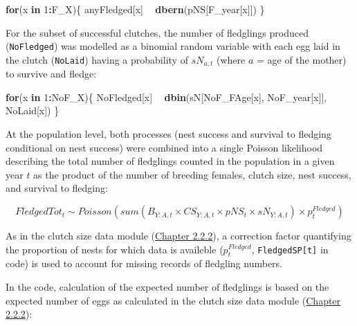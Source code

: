 \documentclass[
]{book}
\newenvironment{Shaded}{\begin{snugshade}}{\end{snugshade}}
\newcommand{\ControlFlowTok}[1]{\textcolor[rgb]{0.13,0.29,0.53}{\textbf{#1}}}
\newcommand{\DecValTok}[1]{\textcolor[rgb]{0.00,0.00,0.81}{#1}}
\newcommand{\KeywordTok}[1]{\textcolor[rgb]{0.13,0.29,0.53}{\textbf{#1}}}
\newcommand{\NormalTok}[1]{#1}
\newcommand{\OperatorTok}[1]{\textcolor[rgb]{0.81,0.36,0.00}{\textbf{#1}}}
\newcommand{\StringTok}[1]{\textcolor[rgb]{0.31,0.60,0.02}{#1}}
\begin{document}
\begin{Shaded}
\begin{Highlighting}[]
\ControlFlowTok{for}\NormalTok{(x }\ControlFlowTok{in} \DecValTok{1}\OperatorTok{:}\NormalTok{F_X)\{}
\NormalTok{  anyFledged[x] }\OperatorTok{~}\StringTok{ }\KeywordTok{dbern}\NormalTok{(pNS[F_year[x]])}
\NormalTok{\}}
\end{Highlighting}
\end{Shaded}

For the subset of successful clutches, the number of fledglings produced
(\texttt{NoFledged}) was modelled as a binomial random variable with each egg laid in
the clutch (\texttt{NoLaid}) having a probability of \(sN_{a,t}\) (where \(a\) = age of the
mother) to survive and fledge:

\begin{Shaded}
\begin{Highlighting}[]
\ControlFlowTok{for}\NormalTok{(x }\ControlFlowTok{in} \DecValTok{1}\OperatorTok{:}\NormalTok{NoF_X)\{}
\NormalTok{    NoFledged[x] }\OperatorTok{~}\StringTok{ }\KeywordTok{dbin}\NormalTok{(sN[NoF_FAge[x], NoF_year[x]], NoLaid[x])}
\NormalTok{\}}
\end{Highlighting}
\end{Shaded}

At the population level, both processes (nest success and survival to fledging
conditional on nest success) were combined into a single Poisson
likelihood describing the total number of fledglings counted in the population
in a given year \(t\) as the product of the number of breeding females, clutch
size, nest success, and survival to fledging:

\begin{equation}
FledgedTot_t  \sim Poisson(sum(B_{Y:A,t}\times CS_{Y:A,t}\times pNS_t\times sN_{Y:A,t}) \times p_t^{Fledged})
\end{equation}

As in the clutch size data module (\protect\hyperlink{ux5cux23ux5cux23ux5cux2520Clutchux5cux2520sizeux5cux2520dataux5cux2520likelihoods}{Chapter 2.2.2}),
a correction factor quantifying the proportion of nests for which data is
availeble (\(p_t^{Fledged}\), \texttt{FledgedSP{[}t{]}} in code) is used to account for
missing records of fledgling numbers.

In the code, calculation of the expected number of fledglings is based on the expected number of eggs as calculated in the clutch size data module
(\protect\hyperlink{ux5cux23ux5cux23ux5cux2520Clutchux5cux2520sizeux5cux2520dataux5cux2520likelihoods}{Chapter 2.2.2}):
\end{document}
